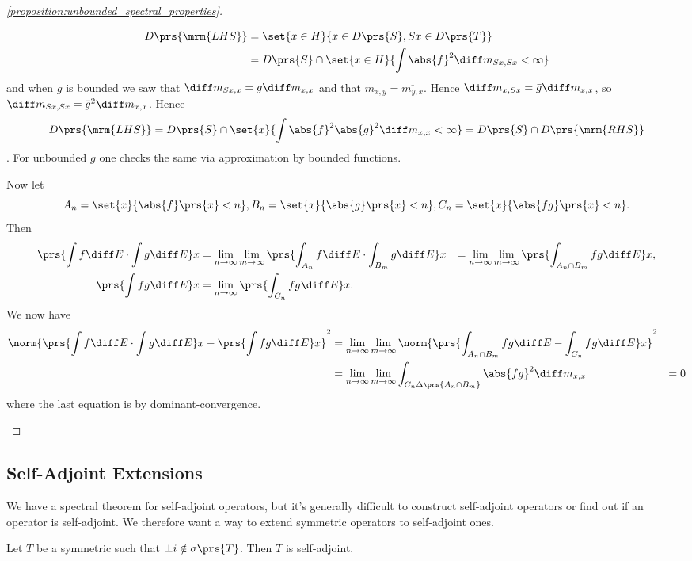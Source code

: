 \documentclass[10pt, twoside]{book}
\begin{document}
\begin{proof}[\ref{proposition:unbounded_spectral_properties}]
\begin{enumerate}
\begin{align*}
D\prs{\mrm{LHS}} &= \set{x \in H}{x \in D\prs{S}, Sx \in D\prs{T}}
\\&= D\prs{S} \cap \set{x \in H}{\int \abs{f}^2 \diff m_{Sx, Sx} < \infty}
\end{align*}
and when $g$ is bounded we saw that $\diff m_{Sx, x} = g \diff m_{x,x}$ and that $m_{x,y} = \overline{m_{y,x}}$.
Hence $\diff m_{x,Sx} = \bar{g} \diff m_{x, x}$, so $\diff m_{Sx, Sx} = \bar{g}^2 \diff m_{x,x}$.
Hence \[D\prs{\mrm{LHS}} = D\prs{S} \cap \set{x}{\int \abs{f}^2 \abs{g}^2 \diff m_{x,x} < \infty} = D\prs{S} \cap D\prs{\mrm{RHS}}\].
For unbounded $g$ one checks the same via approximation by bounded functions.

Now let \[A_n = \set{x}{\abs{f}\prs{x} < n}, B_n = \set{x}{\abs{g}\prs{x} < n}, C_n = \set{x}{\abs{fg}\prs{x} < n} \text{.}\]
Then
\begin{align*}
\prs{\int f \diff E \cdot \int g \diff E}x &= \lim_{n \to \infty} \lim_{m\to\infty} \prs{\int_{A_n} f \diff E \cdot \int_{B_m} g \diff E} x &= \lim_{n\to\infty} \lim_{m\to\infty} \prs{\int_{A_n \cap B_m} fg \diff E} x, \\
\prs{\int fg \diff E}x &= \lim_{n\to\infty} \prs{\int_{C_n} fg \diff E}x \text{.}
\end{align*}
We now have
\begin{align*}
\norm{\prs{\int f \diff E \cdot \int g \diff E} x - \prs{\int fg \diff E}x}^2 &= \lim_{n\to\infty} \lim_{m\to\infty} \norm{\prs{\int_{A_n \cap B_m} fg \diff E - \int_{C_n} fg \diff E}x}^2
\\&=
\lim_{n\to\infty} \lim_{m\to\infty} \int_{C_n \Delta \prs{A_n \cap B_m}} \abs{fg}^2 \diff m_{x,x} &= 0
\end{align*}
where the last equation is by dominant-convergence.
\end{enumerate}
\end{proof}

\subsection{Self-Adjoint Extensions}

We have a spectral theorem for self-adjoint operators, but it's generally difficult to construct self-adjoint operators or find out if an operator is self-adjoint. We therefore want a way to extend symmetric operators to self-adjoint ones.

\begin{proposition}
Let $T$ be a symmetric such that $\pm i \notin \sigma\prs{T}$. Then $T$ is self-adjoint.
\end{proposition}
\end{document}
